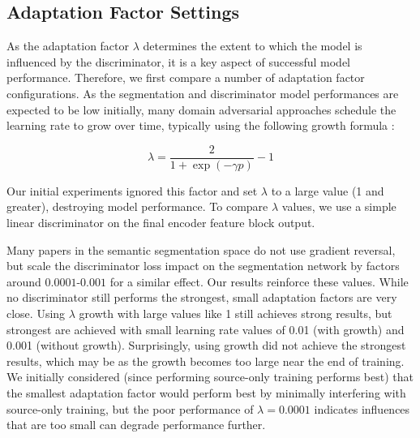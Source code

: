 \documentclass[a4paper,12pt]{report}
\begin{document}
\subsection{Adaptation Factor Settings}
As the adaptation factor $\lambda$ determines the extent to which the model is influenced by the discriminator, it is a key aspect of successful model performance. Therefore, we first compare a number of adaptation factor configurations. As the segmentation and discriminator model performances are expected to be low initially, many domain adversarial approaches schedule the learning rate to grow over time, typically using the following growth formula \cite{ganin_domain-adversarial_2016}:

\begin{equation}
    \lambda = \frac{2}{1 + \exp(-\gamma p)} - 1
\end{equation}

Our initial experiments ignored this factor and set $\lambda$ to a large value (1 and greater), destroying model performance. To compare $\lambda$ values, we use a simple linear discriminator on the final encoder feature block output.

Many papers in the semantic segmentation space do not use gradient reversal, but scale the discriminator loss impact on the segmentation network by factors around $0.0001$-$0.001$ for a similar effect. Our results reinforce these values. While no discriminator still performs the strongest, small adaptation factors are very close. Using $\lambda$ growth with large values like 1 still achieves strong results, but strongest are achieved with small learning rate values of 0.01 (with growth) and 0.001 (without growth). Surprisingly, using growth did not achieve the strongest results, which may be as the growth becomes too large near the end of training. We initially considered (since performing source-only training performs best) that the smallest adaptation factor would perform best by minimally interfering with source-only training, but the poor performance of $\lambda = 0.0001$ indicates influences that are too small can degrade performance further.
\end{document}
